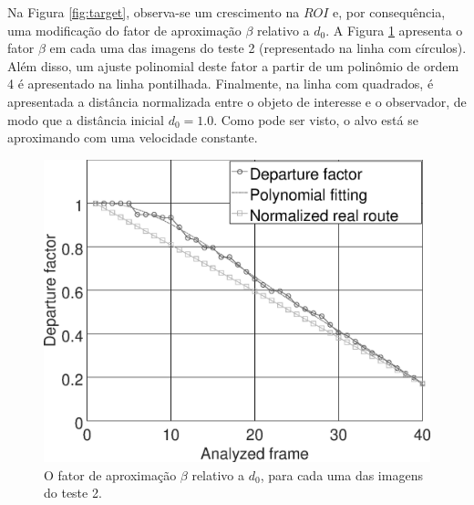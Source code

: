Na Figura \ref{fig:target}, observa-se um crescimento na $ROI$ e, por
consequência, uma modificação do fator de aproximação $\beta$ relativo a $d_0$.
A Figura \ref{fig:res_grapha_b} apresenta o fator $\beta$ em cada uma das imagens 
do teste 2 (representado na linha com círculos).
Além disso, um ajuste polinomial deste fator a partir de um polinômio de ordem 4 é apresentado na linha pontilhada.
Finalmente, na linha com quadrados, é apresentada a distância normalizada entre o objeto de interesse e o observador,
de modo que a distância inicial $d_0=1.0$.
Como pode ser visto, o alvo está se aproximando com uma velocidade constante.
\begin{figure}[H]
\includegraphics[width=\columnwidth]{images/grapha_b.eps}
\caption{O fator de aproximação $\beta$ relativo a $d_0$, para cada uma das imagens do teste 2.}
\label{fig:res_grapha_b}
\end{figure}


